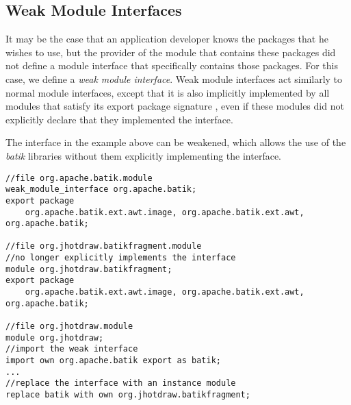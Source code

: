 \subsection{Weak Module Interfaces}

It may be the case that an application developer knows the packages that
he wishes to use, but the provider of the module that contains these packages 
did not define a module interface that specifically contains those packages. For
this case, we define a \textit{weak module interface}. Weak module interfaces act similarly
to normal module interfaces, except that it is also implicitly implemented
by all modules that satisfy its export package signature \cite{mcdirmid01jiazzi, componentnextgen}, 
even if these modules did not explicitly declare that they implemented the interface.

The interface in the example above can be weakened, which allows the use
of the \textit{batik} libraries without them explicitly implementing the interface.

\begin{lstlisting}[caption=Weak Interfaces]
//file org.apache.batik.module
weak_module_interface org.apache.batik;
export package 
	org.apache.batik.ext.awt.image,	org.apache.batik.ext.awt,	org.apache.batik;

//file org.jhotdraw.batikfragment.module
//no longer explicitly implements the interface
module org.jhotdraw.batikfragment;
export package 
	org.apache.batik.ext.awt.image,	org.apache.batik.ext.awt, org.apache.batik;
	
//file org.jhotdraw.module
module org.jhotdraw;
//import the weak interface 
import own org.apache.batik export as batik;
...
//replace the interface with an instance module
replace batik with own org.jhotdraw.batikfragment; 
\end{lstlisting}

%





